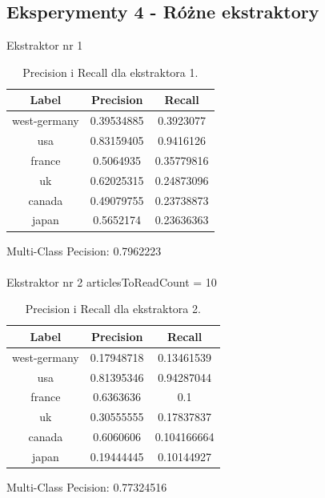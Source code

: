 \documentclass{classrep}
\begin{document}
\subsection{Eksperymenty 4 - Różne ekstraktory}
Ekstraktor nr 1
\begin{table}[H]
\begin{tabular}{|c|c|c|}
\hline
Label        & Precision  & Recall     \\ \hline
west-germany & 0.39534885 & 0.3923077  \\ \hline
usa          & 0.83159405 & 0.9416126  \\ \hline
france       & 0.5064935  & 0.35779816 \\ \hline
uk           & 0.62025315 & 0.24873096 \\ \hline
canada       & 0.49079755 & 0.23738873 \\ \hline
japan        & 0.5652174  & 0.23636363 \\ \hline
\end{tabular}
\caption{Precision i Recall dla ekstraktora 1.}
\end{table}
Multi-Class Pecision: 0.7962223\\
\\
Ekstraktor nr 2
articlesToReadCount = 10
\begin{table}[H]
\begin{tabular}{|c|c|c|}
\hline
Label        & Precision  & Recall      \\ \hline
west-germany & 0.17948718 & 0.13461539  \\ \hline
usa          & 0.81395346 & 0.94287044  \\ \hline
france       & 0.6363636  & 0.1         \\ \hline
uk           & 0.30555555 & 0.17837837  \\ \hline
canada       & 0.6060606  & 0.104166664 \\ \hline
japan        & 0.19444445 & 0.10144927  \\ \hline
\end{tabular}
\caption{Precision i Recall dla ekstraktora 2.}
\end{table}
Multi-Class Pecision: 0.77324516
\end{document}
